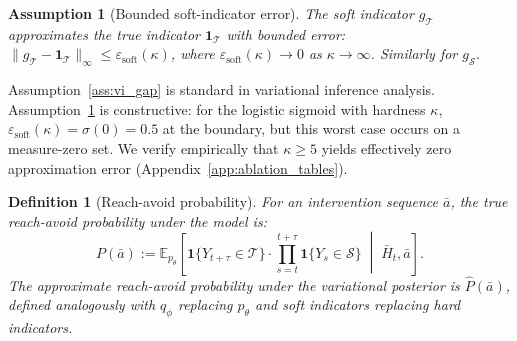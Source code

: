 \documentclass{article}
\newtheorem{definition}{Definition}
\newtheorem{assumption}{Assumption}
\newcommand{\E}{\mathbb{E}}
\newcommand{\bH}{\bar{H}}
\newcommand{\ba}{\bar{a}}
\newcommand{\cT}{\mathcal{T}}
\newcommand{\cS}{\mathcal{S}}
\newcommand{\ind}{\mathbf{1}}
\begin{document}
\begin{assumption}[Bounded soft-indicator error]
\label{ass:soft_error}
The soft indicator $g_\cT$ approximates the true indicator $\ind_\cT$ with bounded error:
$\|g_\cT - \ind_\cT\|_\infty \leq \varepsilon_{\mathrm{soft}}(\kappa)$,
where $\varepsilon_{\mathrm{soft}}(\kappa) \to 0$ as $\kappa \to \infty$. Similarly for $g_\cS$.
\end{assumption}

Assumption~\ref{ass:vi_gap} is standard in variational inference analysis. Assumption~\ref{ass:soft_error} is constructive: for the logistic sigmoid with hardness $\kappa$, $\varepsilon_{\mathrm{soft}}(\kappa) = \sigma(0) = 0.5$ at the boundary, but this worst case occurs on a measure-zero set. We verify empirically that $\kappa \geq 5$ yields effectively zero approximation error (Appendix~\ref{app:ablation_tables}).

\begin{definition}[Reach-avoid probability]
For an intervention sequence $\ba$, the \emph{true reach-avoid probability} under the model is:
\begin{equation}
P(\ba) := \E_{p_\theta}\left[\ind\{Y_{t+\tau} \in \cT\} \cdot \prod_{s=t}^{t+\tau} \ind\{Y_s \in \cS\} \;\middle|\; \bH_t, \ba\right].
\end{equation}
The \emph{approximate reach-avoid probability} under the variational posterior is $\hat{P}(\ba)$, defined analogously with $q_\phi$ replacing $p_\theta$ and soft indicators replacing hard indicators.
\end{definition}
\end{document}
